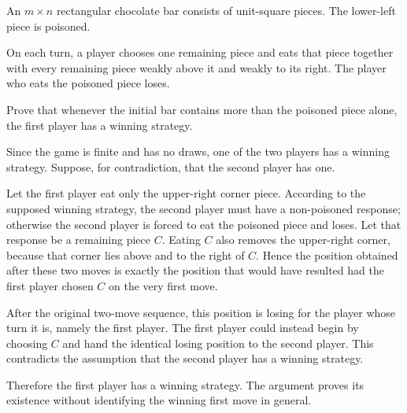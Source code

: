     \begin{expectedproblem}[Chomp]
        An $m\times n$ rectangular chocolate bar consists of unit-square
        pieces. The lower-left piece is poisoned.

        On each turn, a player chooses one remaining piece and eats that piece
        together with every remaining piece weakly above it and weakly to its
        right. The player who eats the poisoned piece loses.

        Prove that whenever the initial bar contains more than the poisoned
        piece alone, the first player has a winning strategy.
    \end{expectedproblem}

    \begin{solution}
        Since the game is finite and has no draws, one of the two players has a
        winning strategy. Suppose, for contradiction, that the second player
        has one.

        Let the first player eat only the upper-right corner piece. According
        to the supposed winning strategy, the second player must have a
        non-poisoned response; otherwise the second player is forced to eat the
        poisoned piece and loses. Let that response be a remaining piece $C$.
        Eating $C$ also removes the upper-right corner, because that corner
        lies above and to the right of $C$. Hence the position obtained after
        these two moves is exactly the position that would have resulted had
        the first player chosen $C$ on the very first move.

        After the original two-move sequence, this position is losing for the
        player whose turn it is, namely the first player. The first player
        could instead begin by choosing $C$ and hand the identical losing
        position to the second player. This contradicts the assumption that
        the second player has a winning strategy.

        Therefore the first player has a winning strategy. The argument proves
        its existence without identifying the winning first move in general.
    \end{solution}

